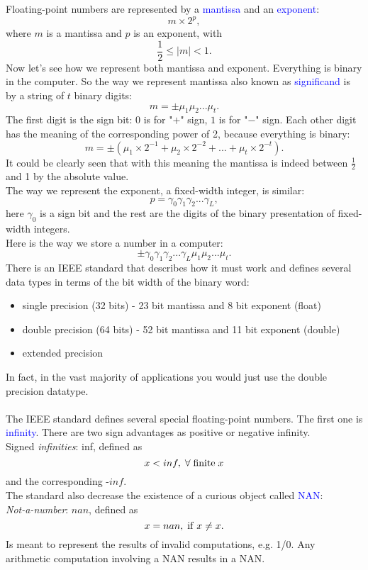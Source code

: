 \documentclass{article}
\begin{document}
Floating-point numbers are represented by a \textcolor{blue}{mantissa} and an \textcolor{blue}{exponent}:
\[
m\times 2^{p},
\]
where $m$ is a mantissa and $p$ is an exponent, with
\[
\frac{1}{2}\leq |m|<1.
\]
Now let's see how we represent both mantissa and exponent. Everything is binary in the computer. So the way we represent mantissa also known as \textcolor{blue}{significand} is by a string of $t$ binary digits:
\[
m=\pm\mu_1\mu_2...\mu_t.
\]
The first digit is the sign bit: $0$ is for "$+$" sign, $1$ is for "$-$" sign. Each other digit has the meaning of the corresponding power of 2, because everything is binary:
\[
m=\pm(\mu_1\times2^{-1}+\mu_2\times2^{-2}+...+\mu_t\times2^{-t}).
\]
It could be clearly seen that with this meaning the mantissa is indeed between $\frac{1}{2}$ and 1 by the absolute value.\\
The way we represent the exponent, a fixed-width integer, is similar:
\[
p=\gamma_0\gamma_1\gamma_2...\gamma_L,
\]
here $\gamma_0$ is a sign bit and the rest are the digits of the binary presentation of fixed-width integers.\\
Here is the way we store a number in a computer:
\[
\pm\gamma_0\gamma_1\gamma_2...\gamma_L\mu_1\mu_2...\mu_t.
\]
There is an IEEE standard that describes how it must work and defines
several data types in terms of the bit width of the binary word:
\begin{itemize}
    \item single precision (32 bits) - 23 bit mantissa and 8 bit exponent (float)
    \item double precision (64 bits) - 52 bit mantissa and 11 bit exponent (double)
    \item extended precision
\end{itemize}
In fact, in the vast majority of
applications you would just
use the double precision datatype.\\
\\
The IEEE standard defines several special floating-point numbers. The first one is \textcolor{blue}{infinity}. There are two sign advantages as positive or negative infinity. \\Signed {\it infinities}: inf, defined as
\[
x<inf,\;\forall\;{\rm finite}\;x
\]
and the corresponding -$inf$.\\
The standard also decrease the existence of a curious object called \textcolor{blue}{NAN}: \\{\it Not-a-number}: $nan$, defined as
\[
x=nan,\;{\rm if}\;x\neq x.
\]
Is meant to represent the results of invalid computations, e.g. 1/0. Any arithmetic computation involving a NAN results in a NAN.
\end{document}
